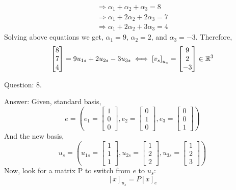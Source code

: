 \documentclass[a4paper]{article}
\begin{document}
\begin{qalist}
\begin{equation}
			\end{equation}
			\begin{align}
				\Rightarrow {\alpha}_{1} + {\alpha}_{2} + {\alpha}_{3} = 8 \\
				\Rightarrow {\alpha}_{1} + 2{\alpha}_{2} + 2{\alpha}_{3} = 7 \\
				\Rightarrow {\alpha}_{1} + 2{\alpha}_{2} + 3{\alpha}_{3} = 4
			\end{align}
			Solving above equations we get, ${\alpha}_{1} = 9$, ${\alpha}_{2} = 2$, and ${\alpha}_{3} = -3$. Therefore, 
			\begin{equation} \notag
				\begin{bmatrix}8 \\ 7 \\ 4\end{bmatrix} = 9{u}_{1s} + 2{u}_{2s} - 3{u}_{3s} \iff {[{v}_{s}]}_{{u}_{s}} = \begin{bmatrix}9 \\ 2 \\ -3\end{bmatrix} \in {\mathbb{R}}^{3}
			\end{equation}
		
		\item[Question: 8.] \setcounter{equation}{0} 
		\item[Answer:] Given, standard basis, 
			\begin{equation} e = 
				\left(
					{e}_{1} = \begin{bmatrix}1 \\ 0 \\ 0\end{bmatrix},
					{e}_{2} = \begin{bmatrix}0 \\ 1 \\ 0\end{bmatrix},
					{e}_{3} = \begin{bmatrix}0 \\ 0 \\ 1\end{bmatrix}
				\right)
			\end{equation}
			And the new basis, 
			\begin{equation}
			{u}_{s} = 
				\left(
					{u}_{1s} = \begin{bmatrix}1 \\ 1 \\ 1\end{bmatrix},
					{u}_{2s} = \begin{bmatrix}1 \\ 2 \\ 2\end{bmatrix},
					{u}_{3s} = \begin{bmatrix}1 \\ 2 \\ 3\end{bmatrix}
				\right)
			\end{equation}
			Now, look for a matrix P to switch from $e$ to ${u}_{s}$: 
			\[{[x]}_{{u}_{s}} = P{[x]}_{e}\]
						

\end{qalist}
\end{document}
